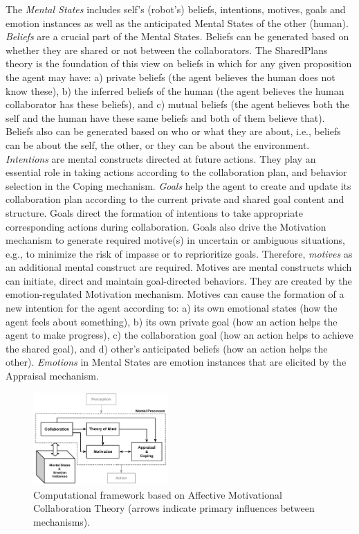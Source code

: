 \documentclass[letterpaper]{article}
\begin{document}
The \textit{Mental States} includes
self's (robot's) beliefs, intentions, motives, goals and emotion instances as
well as the anticipated Mental States of the other (human). \textit{Beliefs} are
a crucial part of the Mental States. Beliefs can be generated based on whether
they are shared or not between the collaborators. The SharedPlans
\cite{grosz:shared-plans,grosz:plans-discourse} theory is the foundation of this
view on beliefs in which for any given proposition the agent may have: a)
private beliefs (the agent believes the human does not know these), b) the
inferred beliefs of the human (the agent believes the human collaborator has
these beliefs), and c) mutual beliefs (the agent believes both the self and the
human have these same beliefs and both of them believe that). Beliefs also can
be generated based on who or what they are about, i.e., beliefs can be about the
self, the other, or they can be about the environment. \textit{Intentions} are
mental constructs directed at future actions. They play an essential role in
taking actions according to the collaboration plan, and behavior selection in
the Coping mechanism. \textit{Goals} help the agent to create and update its
collaboration plan according to the current private and shared goal content and
structure. Goals direct the formation of intentions to take appropriate
corresponding actions during collaboration. Goals also drive the Motivation
mechanism to generate required motive(s) in uncertain or ambiguous situations,
e.g., to minimize the risk of impasse or to reprioritize goals. Therefore,
\textit{motives} as an additional mental construct are required. Motives are
mental constructs which can initiate, direct and maintain goal-directed
behaviors. They are created by the emotion-regulated Motivation mechanism.
Motives can cause the formation of a new intention for the agent according to:
a) its own emotional states (how the agent feels about something), b) its own
private goal (how an action helps the agent to make progress), c) the
collaboration goal (how an action helps to achieve the shared goal), and d)
other's anticipated beliefs (how an action helps the other). \textit{Emotions}
in Mental States are emotion instances that are elicited by the Appraisal
mechanism.

\vspace*{-2mm}
\begin{figure}[tbh]
  \centering
  \includegraphics[width=0.46\textwidth]{figure/theory-general-croped.pdf}
  \vspace*{-5mm}
  \caption{Computational framework based on Affective Motivational Collaboration
  Theory (arrows indicate primary influences between mechanisms).}
  \label{fig:cpm}
  \vspace*{-5mm}
\end{figure}
\end{document}
